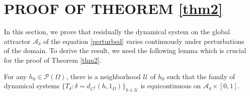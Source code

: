 \documentclass[11pt]{amsart}
\begin{document}
\section{{PROOF OF THEOREM \ref{thm2}}}

In this section, we prove that residually the dynamical system on the global attractor $\mathcal A_\delta$ of the equation \eqref{perturbed} varies continuously under perturbations of the domain. To derive the result, we need the following lemma which is crucial for the proof of Theorem \ref{thm2}.

\begin{lemma}\label{continuity on h}
    For any $h_0\in \mathcal P(\Omega)$, there is a neighborhood $\mathcal{U}$ of $h_0$ such that the family of dynamical systems $\{T_\delta: \delta=d_{C^2}(h,1_\Omega)\}_{h \in \mathcal U} $ is equicontinuous on  $\mathcal{A}_\delta \times [0, 1]$.
\end{lemma}
\end{document}
